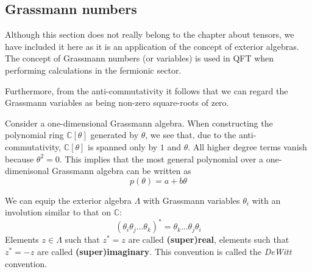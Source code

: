\subsection{Grassmann numbers}

	Although this section does not really belong to the chapter about tensors, we have included it here as it is an application of the concept of exterior algebras. The concept of Grassmann numbers (or variables) is used in QFT when performing calculations in the fermionic sector.
	
	\begin{remark}
		Furthermore, from the anti-commutativity it follows that we can regard the Grassmann variables as being non-zero square-roots of zero.
	\end{remark}
	
	\begin{property}
		Consider a one-dimensional Grassmann algebra. When constructing the polynomial ring $\mathbb{C}[\theta]$ generated by $\theta$, we see that, due to the anti-commutativity, $\mathbb{C}[\theta]$ is spanned only by $1$ and $\theta$. All higher degree terms vanish because $\theta^2 = 0$. This implies that the most general polynomial over a one-dimenisonal Grassmann algebra can be written as
		\begin{equation}
			p(\theta) = a + b\theta
		\end{equation}
	\end{property}
	
	\begin{definition}
		We can equip the exterior algebra $\Lambda$ with Grassmann variables $\theta_i$ with an involution similar to that on $\mathbb{C}$:
		\begin{equation}
			(\theta_i\theta_j...\theta_k)^* = \theta_k...\theta_j\theta_i
		\end{equation}
		Elements $z\in\Lambda$ such that $z^* = z$ are called \textbf{(super)real}, elements such that $z^* = -z$ are called \textbf{(super)imaginary}. This convention is called the \textit{DeWitt} convention.
	\end{definition}